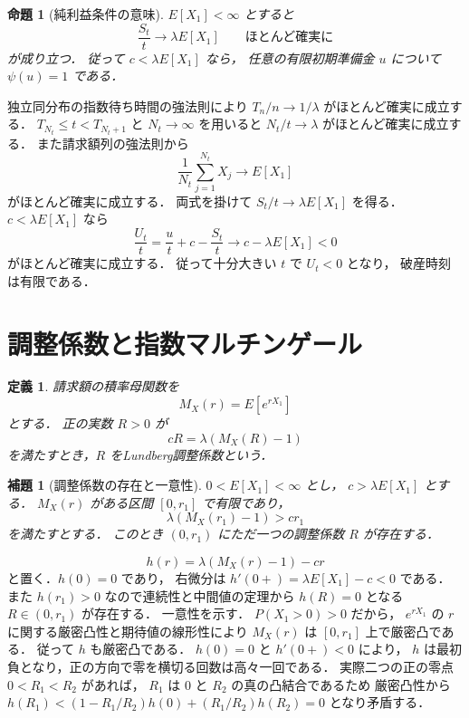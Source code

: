 \documentclass[a5paper,10pt,onecolumn]{jsarticle}
\makeatletter
\theoremstyle{mathnotetheorem}
\newtheorem{definition}[theorem]{定義}
\newtheorem{lemma}[theorem]{補題}
\newtheorem{proposition}[theorem]{命題}
\renewcommand{\proofname}{証明}
\renewenvironment{proof}[1][\proofname]{%
  \par\pushQED{\qed}\normalfont\topsep4\p@\@plus2\p@\relax
  \trivlist\item[\hskip\labelsep\bfseries #1]\ignorespaces
}{\popQED\endtrivlist\@endpefalse}
\makeatother
\begin{document}
\begin{proposition}[純利益条件の意味]\label{prop:net-profit}
$E[X_1]<\infty$ とすると
\[
 \frac{S_t}{t}\longrightarrow\lambda E[X_1]
 \qquad\text{ほとんど確実に}
\]
が成り立つ．
従って $c<\lambda E[X_1]$ なら，
任意の有限初期準備金 $u$ について
$\psi(u)=1$ である．
\end{proposition}
\begin{proof}
独立同分布の指数待ち時間の強法則により
$T_n/n\to1/\lambda$ がほとんど確実に成立する．
$T_{N_t}\le t<T_{N_t+1}$ と
$N_t\to\infty$ を用いると
$N_t/t\to\lambda$ がほとんど確実に成立する．
また請求額列の強法則から
\[
 \frac1{N_t}\sum_{j=1}^{N_t}X_j
 \longrightarrow E[X_1]
\]
がほとんど確実に成立する．
両式を掛けて $S_t/t\to\lambda E[X_1]$ を得る．
$c<\lambda E[X_1]$ なら
\[
 \frac{U_t}{t}=\frac ut+c-\frac{S_t}{t}
 \longrightarrow c-\lambda E[X_1]<0
\]
がほとんど確実に成立する．
従って十分大きい $t$ で $U_t<0$ となり，
破産時刻は有限である．
\end{proof}

\section{調整係数と指数マルチンゲール}

\begin{definition}
請求額の積率母関数を
\[
 M_X(r)=E[e^{rX_1}]
\]
とする．
正の実数 $R>0$ が
\[
 cR=\lambda(M_X(R)-1)
 \tag{L}
\]
を満たすとき，$R$ を\emph{Lundberg調整係数}という．
\end{definition}

\begin{lemma}[調整係数の存在と一意性]\label{lem:adjustment}
$0<E[X_1]<\infty$ とし，
$c>\lambda E[X_1]$ とする．
$M_X(r)$ がある区間 $[0,r_1]$ で有限であり，
\[
 \lambda(M_X(r_1)-1)>cr_1
\]
を満たすとする．
このとき $(0,r_1)$ にただ一つの調整係数 $R$ が存在する．
\end{lemma}
\begin{proof}
\[
 h(r)=\lambda(M_X(r)-1)-cr
\]
と置く．$h(0)=0$ であり，
右微分は $h'(0+)=\lambda E[X_1]-c<0$ である．
また $h(r_1)>0$ なので連続性と中間値の定理から
$h(R)=0$ となる $R\in(0,r_1)$ が存在する．
一意性を示す．
$P(X_1>0)>0$ だから，
$e^{rX_1}$ の $r$ に関する厳密凸性と期待値の線形性により
$M_X(r)$ は $[0,r_1]$ 上で厳密凸である．
従って $h$ も厳密凸である．
$h(0)=0$ と $h'(0+)<0$ により，
$h$ は最初負となり，正の方向で零を横切る回数は高々一回である．
実際二つの正の零点 $0<R_1<R_2$ があれば，
$R_1$ は $0$ と $R_2$ の真の凸結合であるため
厳密凸性から
$h(R_1)<(1-R_1/R_2)h(0)+(R_1/R_2)h(R_2)=0$
となり矛盾する．
\end{proof}
\end{document}
